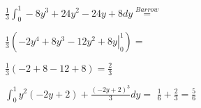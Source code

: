 \documentclass[../parcial.tex]{subfiles}
\begin{document}
\begin{enumerate}
\begin{itemize}
\begin{itemize}
                            $ \frac{1}{3} \int_0^1 -8y^3 + 24y^2 - 24y + 8 dy \stackrel{Barrow}{=} $

                            $ \frac{1}{3} ( \left. -2y^4 + 8y^3 - 12y^2 + 8y  \right |_0^1 ) = $

                            $ \frac{1}{3} ( -2 + 8 - 12 + 8 ) = \frac{2}{3}$
                    \end{itemize}

                    $ \int_0^1  y^2\left(-2y+2\right) + \frac{\left(-2y+2\right)^3}{3} dy = $
                    $\frac{1}{6} + \frac{2}{3} = \frac{5}{6}$

            \end{itemize}

    \end{enumerate}
\end{document}
